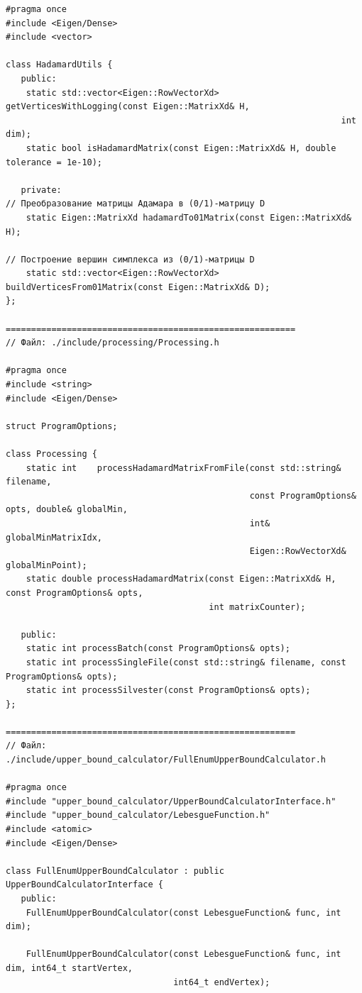 \documentclass[appendix_B]{subfiles}
\begin{document}
\begin{lstlisting}
#pragma once
#include <Eigen/Dense>
#include <vector>

class HadamardUtils {
   public:
    static std::vector<Eigen::RowVectorXd> getVerticesWithLogging(const Eigen::MatrixXd& H,
                                                                  int                    dim);
    static bool isHadamardMatrix(const Eigen::MatrixXd& H, double tolerance = 1e-10);

   private:
// Преобразование матрицы Адамара в (0/1)-матрицу D
    static Eigen::MatrixXd hadamardTo01Matrix(const Eigen::MatrixXd& H);

// Построение вершин симплекса из (0/1)-матрицы D
    static std::vector<Eigen::RowVectorXd> buildVerticesFrom01Matrix(const Eigen::MatrixXd& D);
};

=========================================================
// Файл: ./include/processing/Processing.h

#pragma once
#include <string>
#include <Eigen/Dense>

struct ProgramOptions;

class Processing {
    static int    processHadamardMatrixFromFile(const std::string&    filename,
                                                const ProgramOptions& opts, double& globalMin,
                                                int&                globalMinMatrixIdx,
                                                Eigen::RowVectorXd& globalMinPoint);
    static double processHadamardMatrix(const Eigen::MatrixXd& H, const ProgramOptions& opts,
                                        int matrixCounter);

   public:
    static int processBatch(const ProgramOptions& opts);
    static int processSingleFile(const std::string& filename, const ProgramOptions& opts);
    static int processSilvester(const ProgramOptions& opts);
};

=========================================================
// Файл: ./include/upper_bound_calculator/FullEnumUpperBoundCalculator.h

#pragma once
#include "upper_bound_calculator/UpperBoundCalculatorInterface.h"
#include "upper_bound_calculator/LebesgueFunction.h"
#include <atomic>
#include <Eigen/Dense>

class FullEnumUpperBoundCalculator : public UpperBoundCalculatorInterface {
   public:
    FullEnumUpperBoundCalculator(const LebesgueFunction& func, int dim);

    FullEnumUpperBoundCalculator(const LebesgueFunction& func, int dim, int64_t startVertex,
                                 int64_t endVertex);


\end{lstlisting}
\end{document}
